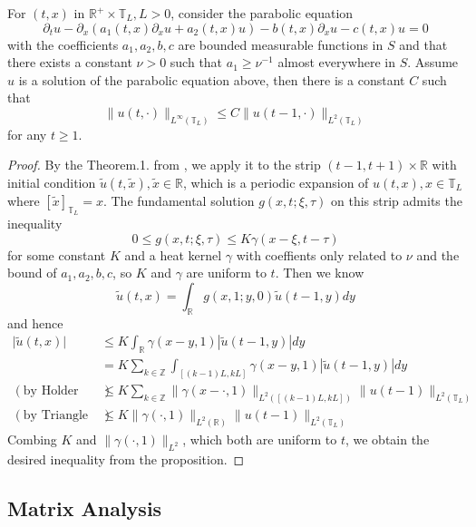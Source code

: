\begin{proposition}
    For $(t, x)$ in $\mathbb{R}^+ \times \mathbb{T}_L, L >0$, consider the parabolic equation
 \[\partial_t u - \partial_{x}({a_1( t,x)\partial_xu + a_2(t,x)u}) - b(t,x)\partial_xu - c(t,x)u = 0\]
 with the coefficients $a_1,a_2,b,c$ are bounded measurable functions in $S$ and that there exists a constant $\nu > 0$ such that $a_1 \geq \nu^{-1}$ almost everywhere in $S$. Assume $u$ is a solution of the parabolic equation above, then there is a constant $C$ such that
 \[
 \lVert u(t,\cdot)\rVert_{L^{\infty}(\mathbb T_L)}
        \leq C\lVert u(t-1,\cdot)\rVert_{L^2(\mathbb T_L)}\label{eq: periodl2estimate} 
 \]
 for any $t \geq 1$.
\end{proposition}
\begin{proof}
    By the Theorem.1. from \cite{Aronson1967}, we apply it to the strip $(t-1,t+1)\times \mathbb{R}$ with initial condition $\tilde{u}(t,\tilde{x}), \tilde{x}\in\mathbb{R}$, which is a periodic expansion of $u(t,x), x\in\mathbb{T}_L$ where $[\tilde{x}]_{\mathbb{T}_L} = x$. The fundamental solution $g(x,t;\xi,\tau)$ on this strip admits the inequality
    \[
    0 \leq g(x,t;\xi,\tau) \leq K\gamma(x-\xi,t-\tau)
    \]
    for some constant $K$ and a heat kernel $\gamma$ with coeffients only related to $\nu$ and the bound of $a_1,a_2,b,c$, so $K$ and $\gamma$ are uniform to $t$. Then we know
    \[
    \tilde{u}(t,x) = \int_{\mathbb{R}} g(x,1;y,0)\tilde{u}(t-1,y)dy
    \]
    and hence
    \[
    \begin{aligned}
        \lvert\tilde{u}(t,x)\rvert &\leq K\int_{\mathbb{R}} \gamma(x-y,1)|\tilde{u}(t-1,y)|dy \\
        &= K \sum\limits_{k\in\mathbb{Z}}\int_{[(k-1)L,kL]}\gamma(x-y,1)|\tilde{u}(t-1,y)| dy
        \\
        (\text{by Holder Inequality})&\leq
        K\sum\limits_{k\in\mathbb{Z}}\lVert\gamma(x-\cdot,1)\rVert_{L^2([(k-1)L,kL])}\lVert u(t-1)\rVert_{L^2(\mathbb{T}_L)}\\
        (\text{by Triangle Inequality})&\leq K \lVert\gamma(\cdot,1)\rVert_{L^2(\mathbb{R})}\lVert u(t-1)\rVert_{L^2(\mathbb{T}_L)}
    \end{aligned}
    \]
    Combing $K$ and $\lVert\gamma(\cdot,1)\rVert_{L^2}$, which both are uniform to $t$, we obtain the desired inequality from the proposition.
\end{proof}


\subsection{Matrix Analysis}

